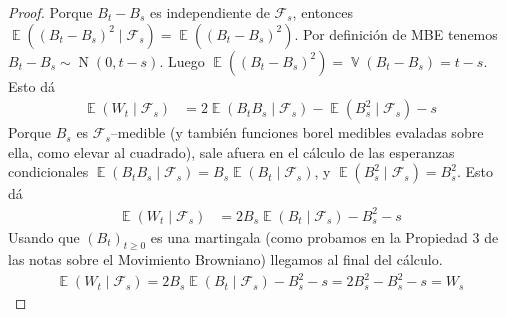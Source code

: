 \documentclass{article}
\DeclareMathOperator{\Expectation}{\mathbb{E}}
\DeclareMathOperator{\Variance}{\mathbb{V}}
\DeclareMathOperator{\normal}{N}
\newcommand{\brownian}{B}
\newcommand{\wiener}{W}
\newcommand{\events}{\mathcal{F}}
\theoremstyle{definition}
\begin{document}
\begin{proof}
Porque \(\brownian_t - \brownian_s\) es independiente de \(\events_s\), entonces \(\Expectation \left( (\brownian_t - \brownian_s)^2 \mid \events_s \right) = \Expectation \left( (\brownian_t - \brownian_s)^2\right)\).
Por definición de MBE tenemos \(\brownian_t - \brownian_s \sim \normal(0, t - s)\).
Luego \(\Expectation \left( (\brownian_t - \brownian_s)^2\right) = \Variance(\brownian_t - \brownian_s)= t - s\).
Esto dá
\begin{align}
	\Expectation(\wiener_t \mid \events_s)
	&= 
	2 \Expectation \left( \brownian_t \brownian_s \mid \events_s \right) 
	- \Expectation \left( \brownian_s^2 \mid \events_s \right) 
	- s
\end{align}
Porque \(B_s\) es \(\events_s\)--medible (y también funciones borel medibles evaladas sobre ella, como elevar al cuadrado), sale afuera en el cálculo de las esperanzas condicionales \(\Expectation \left( \brownian_t \brownian_s \mid \events_s \right) = \brownian_s \Expectation \left( \brownian_t \mid \events_s \right)\), y \(\Expectation \left( \brownian_s^2 \mid \events_s \right) = \brownian_s^2\).
Esto dá
\begin{align}
	\Expectation(\wiener_t \mid \events_s)
	&= 
	2 \brownian_s \Expectation \left( \brownian_t \mid \events_s \right) 
	- \brownian_s^2 
	- s
\end{align}
Usando que \((\brownian_t)_{t \geq 0}\) es una martingala (como probamos en la Propiedad 3 de las notas sobre el Movimiento Browniano) llegamos al final del cálculo.
\begin{align}
	\Expectation(\wiener_t \mid \events_s)
	= 
	2 \brownian_s \Expectation \left( \brownian_t \mid \events_s \right) 
	- \brownian_s^2 
	- s
	=
	2 \brownian_s^2 - \brownian_s^2 - s
	=
	\wiener_s
\end{align}
\end{proof}
\end{document}
